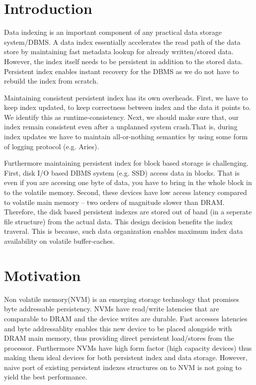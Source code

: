 \section{Introduction}
Data indexing is an important component of any practical data storage system/DBMS.
A data index essentially accelerates the read path of the data store by maintaining
fast metadata lookup for already written/stored data. However, the index itself 
needs to be persistent in addition to the stored data. Persistent index enables 
instant recovery for the DBMS as we do not have to rebuild the index from scratch.

Maintaining consistent persistent index has its own overheads. First, we have to keep 
index updated, to keep correctness between index and the data it points to. We identify
this as runtime-consistency. Next, we should make sure that, our index remain consistent
even after a unplanned system crash.That is, during index updates we have to maintain
all-or-nothing semantics by using some form of logging protocol (e.g. Aries).


Furthermore maintaining persistent index for block based storage is challenging.
First, disk I/O based DBMS system (e.g. SSD) access data in blocks. That is 
even if you are accesing one byte of data, you have to bring in the whole block in to the
volatile memory. Second, these devices have low access latency compared to volatile main memory --
two orders of magnitude slower than DRAM. Therefore, the disk based persistent indexes are
stored out of band (in a seperate file structure) from the actual data. This design
decision benefits the index traveral. This is because, such data organization enables
maximum index data availability on volatile buffer-caches.


\section{Motivation}
Non volatile memory(NVM) is an emerging storage technology that promises byte addressable 
persistency. NVMs have read/write latencies that are comparable to DRAM and the device 
writes are durable. Fast accesses latencies and byte addressablity enables this new device
to be placed alongside with DRAM main memory, thus providing direct persistent load/stores
from the processor. Furthermore NVMs have high form factor (high capacity devices) thus
making them ideal devices for both persistent index and data storage. However, naive port
of existing persistent indexes structures on to NVM is not going to yield the best performance.

